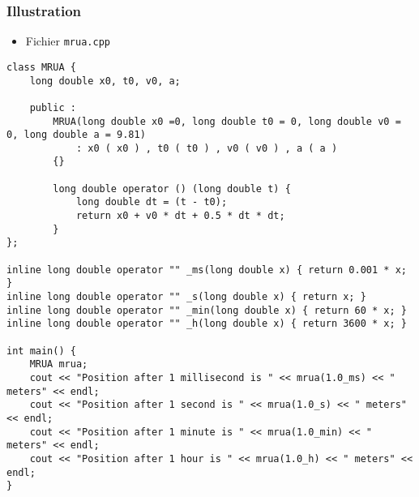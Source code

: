 \begin{frame}[containsverbatim]
\frametitle{Illustration}
\begin{itemize}
\item Fichier \texttt{mrua.cpp}
\end{itemize}
\begin{lstlisting}
class MRUA {
	long double x0, t0, v0, a;
	
	public :
		MRUA(long double x0 =0, long double t0 = 0, long double v0 = 0, long double a = 9.81)
			: x0 ( x0 ) , t0 ( t0 ) , v0 ( v0 ) , a ( a )
		{}
		
		long double operator () (long double t) { 
            long double dt = (t - t0);
            return x0 + v0 * dt + 0.5 * dt * dt;
        }
};

inline long double operator "" _ms(long double x) { return 0.001 * x; }
inline long double operator "" _s(long double x) { return x; }
inline long double operator "" _min(long double x) { return 60 * x; }
inline long double operator "" _h(long double x) { return 3600 * x; }

int main() {
    MRUA mrua;
    cout << "Position after 1 millisecond is " << mrua(1.0_ms) << " meters" << endl;
    cout << "Position after 1 second is " << mrua(1.0_s) << " meters" << endl;
    cout << "Position after 1 minute is " << mrua(1.0_min) << " meters" << endl;
    cout << "Position after 1 hour is " << mrua(1.0_h) << " meters" << endl;
}
\end{lstlisting}
\end{frame}

